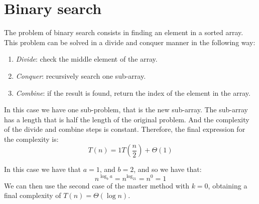 \section{Binary search}

The problem of binary search consists in finding an element in a sorted array. 
This problem can be solved in a divide and conquer manner in the following way: 
\begin{enumerate}
    \item \textit{Divide}: check the middle element of the array.
    \item \textit{Conquer}: recursively search one sub-array. 
    \item \textit{Combine}: if the result is found, return the index of the element in the array. 
\end{enumerate}
In this case we have one sub-problem, that is the new sub-array. 
The sub-array has a length that is half the length of the original problem. 
And the complexity of the divide and combine steps is constant.
Therefore, the final expression for the complexity is: 
\[T(n)=1T\left(\dfrac{n}{2}\right)+\Theta(1)\]

In this case we have that $a=1$, and $b=2$, and so we have that: 
\[n^{\log_ba}=n^{\log_21}=n^0=1\]
We can then use the second case of the master method with $k=0$, obtaining a final complexity of $T(n)=\Theta(\log n)$. 